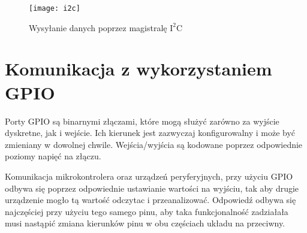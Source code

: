 \begin{figure}[h]
\centering
\texttt{[image: i2c]}
\caption{Wysyłanie danych poprzez magistralę $\mathrm{I^{2}C}$}
\label{fig:i2c}
\end{figure}

\section{Komunikacja z wykorzystaniem GPIO}
Porty GPIO są binarnymi złączami, które mogą służyć zarówno za wyjście dyskretne, jak i wejście. Ich kierunek jest zazwyczaj konfigurowalny i może być zmieniany w dowolnej chwile. Wejścia/wyjścia są kodowane poprzez odpowiednie poziomy napięć na złączu.

Komunikacja mikrokontrolera oraz urządzeń peryferyjnych, przy użyciu GPIO odbywa się poprzez odpowiednie ustawianie wartości na wyjściu, tak aby drugie urządzenie mogło tą wartość odczytac i przeanalizować. Odpowiedź odbywa się najczęściej przy użyciu tego samego pinu, aby taka funkcjonalność zadziałała musi nastąpić zmiana kierunków pinu w obu częściach układu na przeciwny.

